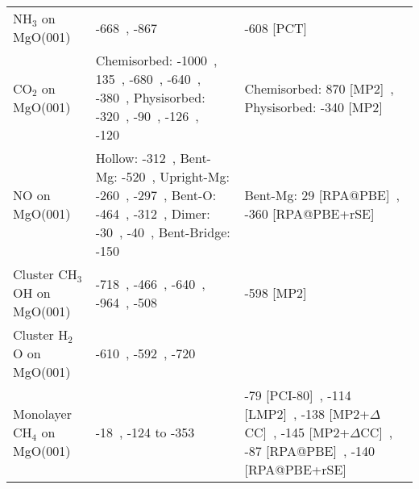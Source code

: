 \begin{table}
\begin{adjustbox}{center}
\begin{tabular}{lp{7cm}p{7cm}}
NH$_3$ on MgO(001) & -668~\cite{pughEnergeticsNH3Adsorption1994}, -867~\cite{nakajimaAmmoniaAdsorptionMgO1996a} & -608 [PCT]~\cite{alloucheVibrationalInfraredSpectrum1995} \\
CO$_2$ on MgO(001) & Chemisorbed: -1000~\cite{manaeActivationCO2CH42022}, 135~\cite{jensenCO2SorptionMgO2005b}, -680~\cite{downingReactivityCO2MgO2013}, -640~\cite{mazheikaNiSubstitutionalDefects2016a}, -380~\cite{baltrusaitisPeriodicDFTStudy2012a}, Physisorbed: -320~\cite{lvCO2AdsorptionKpromoted2024}, -90~\cite{cornuLewisAcidoBasicInteractions2012b}, -126~\cite{hammamiCO2AdsorptionSurfaces2008}, -120~\cite{manaeActivationCO2CH42022} & Chemisorbed: 870 [MP2]~\cite{pacchioniInitioClusterModel1994b}, Physisorbed: -340 [MP2]~\cite{pacchioniPhysisorbedChemisorbedCO21993a} \\
NO on MgO(001) & Hollow: -312~\cite{songRemarkablyStrongChemisorption2017a}, Bent-Mg: -520~\cite{yanagisawaThreeTypesAdsorptions1999b}, Upright-Mg: -260~\cite{rodriguezStudiesBehaviorMixedmetal2001d}, -297~\cite{anezNONO2Adsorption2017a}, Bent-O: -464~\cite{mileticFirstPrinciplesCharacterizationNOx2003a}, -312~\cite{schneiderDramaticCooperativeEffects2002a,schneiderQualitativeDifferencesAdsorption2004a}, Dimer: -30~\cite{luAdsorptionDecompositionNO1999b}, -40~\cite{divalentinNOMonomersMgO2002a}, Bent-Bridge: -150~\cite{limDensityFunctionalTheory2019} & Bent-Mg: 29 [RPA@PBE]~\cite{bajdichSurfaceEnergeticsAlkalineearth2015b}, -360 [RPA@PBE+rSE]~\cite{bajdichSurfaceEnergeticsAlkalineearth2015b} \\
Cluster CH$_3$OH on MgO(001) & -718~\cite{rodriguezAdsorptionMethanolMolecules2007b}, -466~\cite{gayDensityFunctionalStudy2005a}, -640~\cite{manTheoreticalAspectsMethyl2017}, -964~\cite{a.sainnaCombinedPeriodicDFT2021a}, -508~\cite{petitjeanQuantitativeInvestigationMgO2010a} & -598 [MP2]~\cite{brandaTheoreticalStudyCharge2002b} \\
Cluster H$_2$O on MgO(001) & -610~\cite{huProtonTransferAdsorbed2010a}, -592~\cite{alvimDensityFunctionalTheorySimulation2012}, -720~\cite{dingHydrationStructureFlat2021} &  \\
Monolayer CH$_4$ on MgO(001) & -18~\cite{drummondDensityFunctionalInvestigation2006a,stimacSimulatingCH4Physisorption2008}, -124 to -353~\cite{r.rehakIncludingDispersionDensity2020} & -79 [PCI-80]~\cite{todnemMolecularAdsorptionMethane1999a}, -114 [LMP2]~\cite{pisaniPeriodicLocalMP22008b}, -138 [MP2+$\Delta$CC]~\cite{tosoniAccurateQuantumChemical2010}, -145 [MP2+$\Delta$CC]~\cite{alessioChemicallyAccurateAdsorption2018}, -87 [RPA@PBE]~\cite{bajdichSurfaceEnergeticsAlkalineearth2015b}, -140 [RPA@PBE+rSE]~\cite{bajdichSurfaceEnergeticsAlkalineearth2015b} \\

\end{tabular}
\end{adjustbox}
\end{table}
